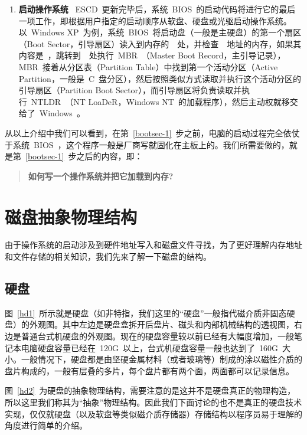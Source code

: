 \begin{enumerate}
\item{\textbf{启动操作系统}} \label{bootsec-1} ~ESCD~更新完毕后，系统~BIOS~的启动代码将进行它的最后一项工作，即根据用户指定的启动顺序从软盘、硬盘或光驱启动操作系统。以~Windows XP~为例，系统~BIOS~将启动盘（一般是主硬盘）的第一个扇区（Boot Sector，引导扇区）读入到内存的~~处，并检查~~地址的内存，如果其内容是~，跳转到~~处执行~MBR~（Master Boot Record，主引导记录），MBR~接着从分区表（Partition Table）中找到第一个活动分区（Active Partition，一般是~C~盘分区），然后按照类似方式读取并执行这个活动分区的引导扇区（Partition Boot Sector），而引导扇区将负责读取并执行~NTLDR~（NT LoaDeR，Windows NT~的加载程序），然后主动权就移交给了~Windows~。
\end{enumerate}

从以上介绍中我们可以看到，在第~\ref{bootsec-1}~步之前，电脑的启动过程完全依仗于系统~BIOS~，这个程序一般是厂商写就固化在主板上的。我们所需要做的，就是第~\ref{bootsec-1}~步之后的内容，即：
\begin{quote}
\textbf{如何写一个操作系统并把它加载到内存?}
\end{quote}

\section{磁盘抽象物理结构}\label{disk_structure}

由于操作系统的启动涉及到硬件地址写入和磁盘文件寻找，为了更好理解内存地址和文件存储的相关知识，我们先来了解一下磁盘的结构。

\subsection{硬盘}


图~\ref{hd1}~所示就是硬盘（如非特指，我们这里的“硬盘”一般指代磁介质非固态硬盘）的外观图。其中左边是硬盘盒拆开后盘片、磁头和内部机械结构的透视图，右边是普通台式机硬盘的外观图。现在的硬盘容量较以前已经有大幅度增加，一般笔记本电脑硬盘容量已经在~120G~以上，台式机硬盘容量一般也达到了~160G~大小。一般情况下，硬盘都是由坚硬金属材料（或者玻璃等）制成的涂以磁性介质的盘片构成的，一般有层叠的多片，每个盘片都有两个面，两面都可以记录信息。


图~\ref{hd2}~为硬盘的抽象物理结构，需要注意的是这并不是硬盘真正的物理构造，所以这里我们称其为“抽象”物理结构。因此我们下面讨论的也不是真正的硬盘技术实现，仅仅就硬盘（以及软盘等类似磁介质存储器）存储结构以程序员易于理解的角度进行简单的介绍。

